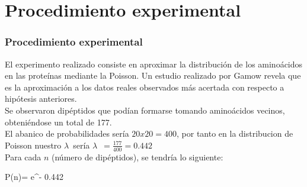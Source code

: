 \documentclass{beamer}
\newcommand{\LA}{{$\lambda$}}
\begin{document}
\section{Procedimiento experimental}
\begin{frame}
\frametitle{Procedimiento experimental}
El experimento realizado consiste en aproximar la distribución de los aminoácidos en las proteínas mediante la Poisson.
Un estudio realizado por Gamow revela que es la aproximación a los datos reales observados más acertada con respecto a hipótesis anteriores.\\
Se observaron dipéptidos que podían formarse tomando aminoácidos vecinos, obteniéndose un total de 177. \\
El abanico de probabilidades sería $20x20 = 400$, por tanto en la distribucion de Poisson nuestro \LA \ sería \LA \ $ = \frac {177}{400}=0.442$\\
Para cada $n$ (número de dipéptidos), se tendría lo siguiente:
\centerline {P(n)= e^{- 0.442}}


\end{frame}


\end{document}
